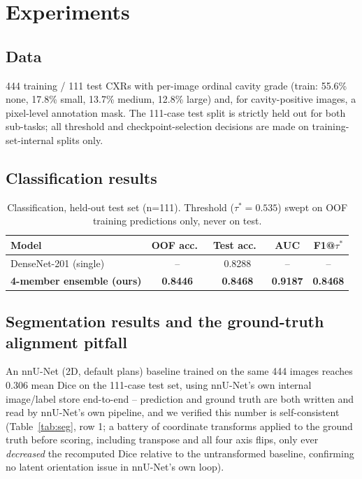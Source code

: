 \documentclass[runningheads]{llncs}
\begin{document}
\section{Experiments}

\subsection{Data}

444 training / 111 test CXRs with per-image ordinal cavity grade (train:
55.6\% none, 17.8\% small, 13.7\% medium, 12.8\% large) and, for
cavity-positive images, a pixel-level annotation mask. The 111-case test
split is strictly held out for both sub-tasks; all threshold and
checkpoint-selection decisions are made on training-set-internal splits
only.

\subsection{Classification results}

\begin{table}[t]
\centering
\caption{Classification, held-out test set (n=111). Threshold ($\tau^*=0.535$)
swept on OOF training predictions only, never on test.}
\label{tab:cls}
\begin{tabular}{lcccc}
\toprule
Model & OOF acc.\ & Test acc.\ & AUC & F1@$\tau^*$ \\
\midrule
DenseNet-201 (single)         & --     & 0.8288 & --     & --     \\
\textbf{4-member ensemble (ours)} & \textbf{0.8446} & \textbf{0.8468} & \textbf{0.9187} & \textbf{0.8468} \\
\bottomrule
\end{tabular}
\end{table}

\subsection{Segmentation results and the ground-truth alignment pitfall}
\label{sec:pitfall}

An nnU-Net (2D, default plans) baseline trained on the same 444 images
reaches 0.306 mean Dice on the 111-case test set, using nnU-Net's own
internal image/label store end-to-end -- prediction and ground truth are
both written and read by nnU-Net's own pipeline, and we verified this number
is self-consistent (Table~\ref{tab:seg}, row 1; a battery of coordinate
transforms applied to the ground truth before scoring, including transpose
and all four axis flips, only ever \emph{decreased} the recomputed Dice
relative to the untransformed baseline, confirming no latent orientation
issue in nnU-Net's own loop).
\end{document}
